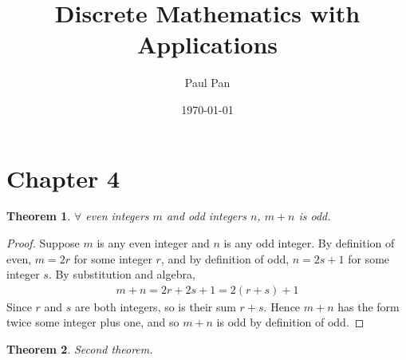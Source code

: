\documentclass{article}
\title{Discrete Mathematics with Applications}
\author{Paul Pan}
\date{\today}
\begin{document}
\maketitle

\section*{Chapter 4}

\newtheorem{theorem}{Theorem}
\begin{theorem}
    $\forall$ even integers $m$ and odd integers $n$, $m + n$ is odd.
\end{theorem}

\begin{proof}
    Suppose $m$ is any even integer and $n$ is any odd integer. By definition of even,
    $m = 2r$ for some integer $r$, and by definition of odd, $n = 2s + 1$ for some
    integer $s$. By substitution and algebra,
    \begin{align*}
        m + n = 2r + 2s + 1 = 2(r + s) + 1
    \end{align*}
    Since $r$ and $s$ are both integers, so is their sum $r + s$. Hence $m + n$ has the
    form twice some integer plus one, and so $m + n$ is odd by definition of odd.
\end{proof}

\begin{theorem}
    Second theorem.
\end{theorem}
\end{document}
